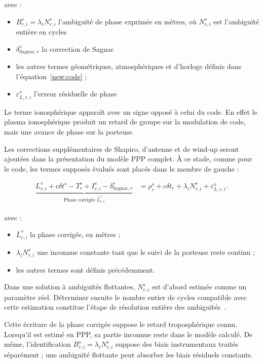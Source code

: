avec :

\begin{itemize}
    \item $B_{r,i}^s=\lambda_i N_{r,i}^s$ l'ambiguïté de phase exprimée
    en mètres, où $N_{r,i}^s$ est l'ambiguïté entière en cycles 
    \item $\delta_{\mathrm{Sagnac},r}^s$ la correction de Sagnac 
    \item les autres termes géométriques, atmosphériques et d'horloge
    définis dans l'équation~\eqref{new:code} ;
    \item $\varepsilon_{L,r,i}^s$ l'erreur résiduelle de phase
\end{itemize}

Le terme ionosphérique apparaît avec un signe opposé à celui du code. En effet le plasma
ionosphérique produit un retard de groupe sur la modulation de code, mais une
avance de phase sur la porteuse. 

Les corrections supplémentaires de Shapiro, d'antenne et de wind-up seront
ajoutées dans la présentation du modèle PPP complet. À ce stade, comme pour
le code, les termes supposés évalués sont placés dans le membre de gauche :

\begin{align}
\underbrace{
L_{r,i}^s
+c\delta t^s
-T_r^s
+I_{r,i}^s
-\delta_{\mathrm{Sagnac},r}^s
}_{\text{Phase corrigée }\overline L_{r,i}^s}
&=
\rho_r^s+c\delta t_r+\lambda_i N_{r,i}^s+\varepsilon_{L,r,i}^s.
\label{eq:phase_corrigee}
\end{align}

avec :

\begin{itemize}
    \item $\overline L_{r,i}^s$ la phase corrigée, en mètres ;
    \item $\lambda_i N_{r,i}^s$ une inconnue constante tant que le suivi de la porteuse
    reste continu ;
    \item les autres termes sont définis précédemment.
\end{itemize}

Dans une solution à ambiguïtés flottantes, $N_{r,i}^s$ est d'abord estimée
comme un paramètre réel. Déterminer ensuite le nombre entier de cycles
compatible avec cette estimation constitue l'étape de résolution entière des
ambiguïtés~\cite{teunissen2017ambiguity}.


Cette écriture de la phase corrigée suppose le retard troposphérique connu.
Lorsqu'il est estimé en PPP, sa partie inconnue reste dans le modèle calculé.
De même, l'identification $B_{r,i}^s=\lambda_iN_{r,i}^s$ suppose des biais
instrumentaux traités séparément ; une ambiguïté flottante peut absorber
les biais résiduels constants.

